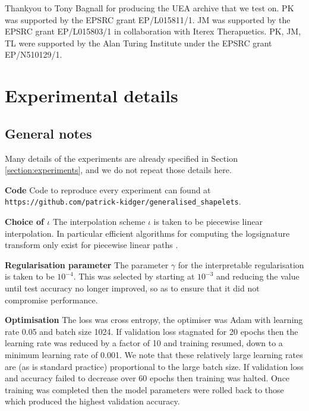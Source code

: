 \documentclass{article}
\theoremstyle{plain}
\theoremstyle{definition}
\newcommand{\boldheading}[1]{

\textbf{#1}\quad}
\begin{document}
	
	\begin{ack}
	Thankyou to Tony Bagnall for producing the UEA archive that we test on. PK was supported by the EPSRC grant EP/L015811/1. JM was supported by the EPSRC grant EP/L015803/1 in collaboration with Iterex Therapuetics. PK, JM, TL were supported by the Alan Turing Institute under the EPSRC grant EP/N510129/1.
	\end{ack}
	
	\small
	
	 
	
	\normalsize
	\newpage
	\appendix
	
	\section{Experimental details}\label{appendix:experimental}
	\subsection{General notes}
	Many details of the experiments are already specified in Section \ref{section:experiments}, and we do not repeat those details here.
	
	\boldheading{Code} Code to reproduce every experiment can found at \texttt{https://github.com/patrick-kidger/generalised\_shapelets}.
	
	\boldheading{Choice of $\iota$} The interpolation scheme $\iota$ is taken to be piecewise linear interpolation. In particular efficient algorithms for computing the logsignature transform only exist for piecewise linear paths \cite{signatory}.
	
	\boldheading{Regularisation parameter} The parameter $\gamma$ for the interpretable regularisation is taken to be $10^{-4}$. This was selected by starting at $10^{-3}$ and reducing the value until test accuracy no longer improved, so as to ensure that it did not compromise performance.
	
	\boldheading{Optimisation} %
The loss was cross entropy, the optimiser was Adam \cite{kingma2015} with learning rate 0.05 and batch size 1024. If validation loss stagnated for 20 epochs then the learning rate was reduced by a factor of 10 and training resumed, down to a minimum learning rate of 0.001. We note that these relatively large learning rates are (as is standard practice) proportional to the large batch size. If validation loss and accuracy failed to decrease over 60 epochs then training was halted. Once training was completed then the model parameters were rolled back to those which produced the highest validation accuracy.
	
\end{document}
